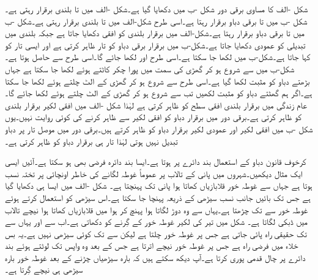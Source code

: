 شکل -الف کا مساوی برقی دور شکل -ب میں دکھایا گیا ہے۔شکل -الف میں  تا  بلندی برقرار رہتی ہے۔شکل -ب میں  تا  برقی دباو برقرار رہتا ہے۔اسی طرح شکل-الف میں   تا  بلندی برقرار رہتی ہے۔شکل -ب میں  تا  برقی دباو برقرار رہتا ہے۔شکل-الف میں برقرار بلندی کو افقی دکھایا جاتا ہے جبکہ بلندی میں تبدیلی کو عمودی دکھایا جاتا ہے۔شکل-ب میں برقرار برقی دباو کو تار ظاہر کرتی ہے اور ایسی تار کو  کہا جاتا ہے۔شکل-ب میں  لکھا جا سکتا ہے۔اسی طرح  اور  لکھا جائے گا۔اسی طرح  سے  حاصل ہوتا ہے۔شکل-ب میں  سے شروع ہو کر گھڑی کی سمت میں پورا چکر کاٹتے ہوئے   لکھا جا سکتا ہے جہاں بڑھتے دباو کو مثبت لکھا گیا ہے۔اسی طرح  سے شروع ہو کر گھڑی کے الٹ چلتے ہوئے  لکھا جا سکتا ہے۔اگر ہم گھٹتے دباو کو مثبت لکھیں تب   سے شروع ہو کر گھڑی کے الٹ چلتے ہوئے  لکھا جائے گا۔عام زندگی میں برقرار بلندی افقی سطح کو ظاہر کرتی ہے لہٰذا شکل -الف میں افقی لکیر برقرار بلندی کو ظاہر کرتی ہے۔برقی دور میں برقرار دباو کو افقی لکیر سے ظاہر کرنے کی کوئی روایت نہیں۔یوں شکل -ب میں افقی لکیر  اور عمودی لکیر  برقرار دباو کو ظاہر کرتے ہیں۔برقی دور میں موصل تار پر  دباو تبدیل نہیں ہوتی لہٰذا تار ہی برقرار دباو کو ظاہر کرتی ہے۔

کرخوف قانون دباو کے استعمال بند دائرے پر ہوتا ہے۔ایسا بند دائرہ فرضی بھی ہو سکتا ہے۔آئیں ایسی ایک مثال دیکھیں۔شہروں میں پانی کے تالاب  پر عموماً غوطہ لگانے کی خاطر اونچائی پر تختہ نسب ہوتا ہے جہاں سے غوطہ خور قلابازیاں کھاتا ہوا پانی تک پہنچتا ہے۔ شکل -الف میں ایسا ہی  دکھایا گیا ہے جس تک بائیں جانب نسب سیڑھی کے ذریعہ پہنچا جا سکتا ہے۔اس سیڑھی کو استعمال کرتے ہوئے غوطہ خور  سے  تک چڑھتا ہے۔یہاں سے وہ دوڑ لگاتا ہوا  پہنچ کر ہوا میں قلابازیاں کھاتا ہوا نیچے تالاب میں ڈبکی لگاتا ہے۔ شکل میں تیر کی لکیر غوطہ خور کے گِرنے کو دکھاتی ہے۔اب  سے  اور یہاں سے  تک حقیقی راہ پائی جاتی ہے جس پر غوطہ خور چلتا ہے لیکن  سے  تک کوئی سیڑھی نہیں ہے۔یہ بس خلاء میں فرضی راہ ہے جس پر غوطہ خور نیچے اترتا ہے جس کے بعد وہ واپس  تک لوٹتے ہوئے بند دائرے پر چال قدمی پوری کرتا ہے۔آپ دیکھ سکتے ہیں کہ بارہ سیڑھیاں چڑنے کے بعد غوطہ خور بارہ سیڑھی ہی نیچے گِرتا ہے۔

